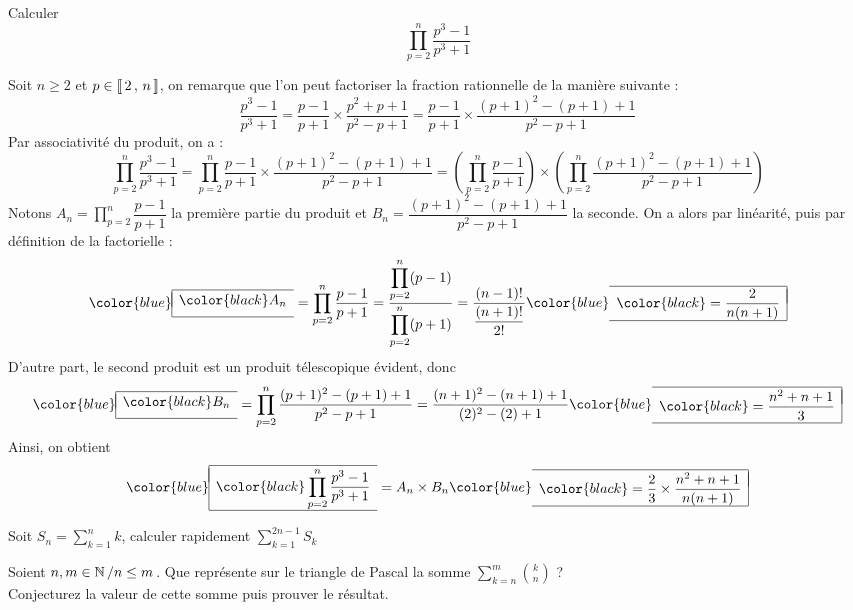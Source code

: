 \documentclass{fancybook}
\newcommand{\lboxed}[1]{{\color{blue}\begin{array}{|l}\hline\\[-2.4ex]{\color{black}#1}\\[1.2ex]\hline\end{array}}}
\newcommand{\rboxed}[1]{{\color{blue}\begin{array}{r|}\hline\\[-2.4ex]{\color{black}#1}\\[1.2ex]\hline\end{array}}}
\begin{document}
\begin{exercice}
Calculer 
\[
\displaystyle\prod\limits_{p=2}^{n} \dfrac{p^3-1}{p^3+1}
\]
\end{exercice}

\begin{solution}
Soit $n \ge 2$ et $p \in \left\llbracket \, 2 \, , \, n \, \right\rrbracket$, on remarque que l'on peut factoriser la fraction rationnelle de la manière suivante :
\[
\dfrac{p^3-1}{p^3+1} 
= \dfrac{p-1}{p+1} \times \dfrac{p^2 + p + 1}{p^2 - p + 1} 
= \dfrac{p-1}{p+1} \times \dfrac{(p+1)^2 - (p + 1) + 1}{p^2 - p + 1}
\]
Par associativité du produit, on a :
\[
\displaystyle\prod\limits_{p=2}^{n} \dfrac{p^3-1}{p^3+1} 
=
\displaystyle\prod\limits_{p=2}^{n} \dfrac{p-1}{p+1} \times \dfrac{(p+1)^2 - (p + 1) + 1}{p^2 - p + 1}
= \left(\displaystyle\prod\limits_{p=2}^{n} \dfrac{p-1}{p+1}\right) 
\times 
\left(\displaystyle\prod\limits_{p=2}^{n} \dfrac{(p+1)^2 - (p + 1) + 1}{p^2 - p + 1}\right)
\]
Notons $A_n = \displaystyle\prod\limits_{p=2}^{n} \dfrac{p-1}{p+1}$ la première partie du produit et $B_n=\dfrac{(p+1)^2 - (p + 1) + 1}{p^2 - p + 1}$ la seconde.
On a alors par linéarité, puis par définition de la factorielle :
\[
\lboxed{A_n} 
= \displaystyle\prod\limits_{p=2}^{n}\dfrac{p-1}{p+1} 
= \dfrac{\displaystyle\prod\limits_{p=2}^{n}(p-1)}{\displaystyle\prod\limits_{p=2}^{n}(p+1)} 
= \dfrac{(n-1)!}{\dfrac{(n+1)!}{2!}} 
\rboxed{= \dfrac{2}{n(n+1)}}
\]
D'autre part, le second produit est un produit télescopique évident, donc
\[
\lboxed{B_n}
= \displaystyle\prod\limits_{p=2}^{n}\dfrac{(p+1)^2 - (p + 1) + 1}{p^2 - p + 1} 
= \dfrac{(n+1)^2 - (n + 1) + 1}{(2)^2 - (2) + 1} 
\rboxed{= \dfrac{n^2 + n + 1}{3}}
\]
Ainsi, on obtient 
\[
\lboxed{\displaystyle\prod\limits_{p=2}^{n}\dfrac{p^3-1}{p^3+1}} 
= A_n \times B_n 
\rboxed{= \dfrac{2}{3}\times \dfrac{n^2+n+1}{n(n+1)}}
\]
\end{solution}

\begin{exercice}
Soit $S_n=\displaystyle\sum\limits_{k=1}^{n} k$, calculer rapidement $\displaystyle\sum\limits_{k=1}^{2n-1} S_k$
\end{exercice}


\begin{exercice}
Soient $n,m\in\mathbb{N}\left/n \le m\right.$. Que représente sur le triangle de Pascal la somme $\displaystyle\sum\limits_{k=n}^{m} \binom{k}{n}$ ?\\
Conjecturez la valeur de cette somme puis prouver le résultat.
\end{exercice}
\end{document}
